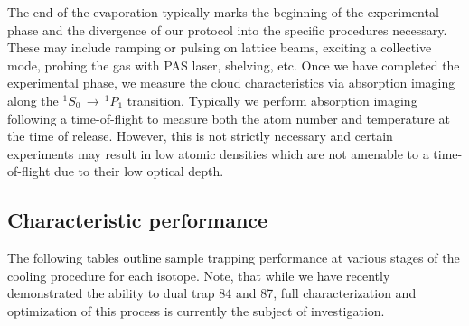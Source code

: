 The end of the evaporation typically marks the beginning of the experimental phase and the divergence of our protocol into the specific procedures necessary. 
These may include ramping or pulsing on lattice beams, exciting a collective mode, probing the gas with PAS laser, shelving, etc. 
Once we have completed the experimental phase, we measure the cloud characteristics via absorption imaging along the $^1S_0\,\rightarrow\,^1P_1$ transition. 
Typically we perform absorption imaging following a time-of-flight to measure both the atom number and temperature at the time of release. 
However, this is not strictly necessary and certain experiments may result in low atomic densities which are not amenable to a time-of-flight due to their low optical depth.

\subsection{Characteristic performance} \label{sec:benchmark_trapping}
The following tables outline sample trapping performance at various stages of the cooling procedure for each isotope.
Note, that while we have recently demonstrated the ability to dual trap 84 and 87, full characterization and optimization of this process is currently the subject of investigation.

